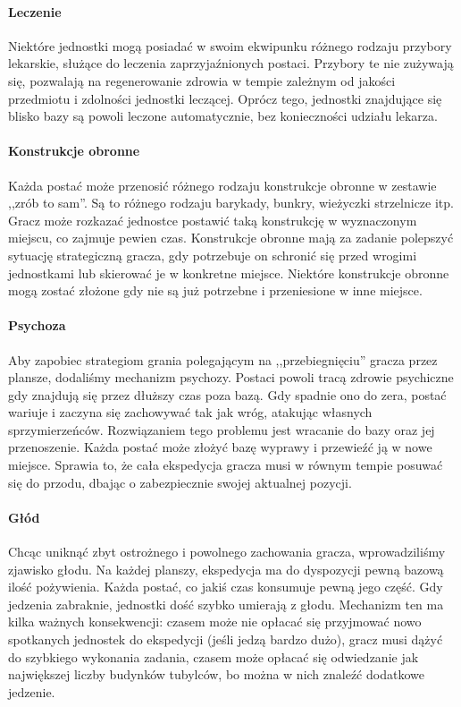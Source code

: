 \documentclass[licencjacka]{pracamgr}
\begin{document}
    \paragraph{Leczenie}
      Niektóre jednostki mogą posiadać w swoim ekwipunku różnego rodzaju przybory lekarskie, służące do leczenia zaprzyjaźnionych postaci.
      Przybory te nie zużywają się, pozwalają na regenerowanie zdrowia w tempie zależnym od jakości przedmiotu i zdolności jednostki leczącej.
      Oprócz tego, jednostki znajdujące się blisko bazy są powoli leczone automatycznie, bez konieczności udziału lekarza.
    \paragraph{Konstrukcje obronne}
      Każda postać może przenosić różnego rodzaju konstrukcje obronne w zestawie ,,zrób to sam''. Są to różnego rodzaju barykady, bunkry, wieżyczki
      strzelnicze itp. Gracz może rozkazać jednostce postawić taką konstrukcję w wyznaczonym miejscu, co zajmuje pewien czas.
      Konstrukcje obronne mają za zadanie polepszyć sytuację strategiczną gracza, gdy potrzebuje on schronić się przed wrogimi jednostkami lub
      skierować je w konkretne miejsce. Niektóre konstrukcje obronne mogą zostać złożone gdy nie są już potrzebne i przeniesione w inne miejsce.
    \paragraph{Psychoza}
      Aby zapobiec strategiom grania polegającym na ,,przebiegnięciu'' gracza przez plansze, dodaliśmy mechanizm psychozy. Postaci
      powoli tracą zdrowie psychiczne gdy znajdują się przez dłuższy czas poza bazą. Gdy spadnie ono do zera, postać wariuje i
      zaczyna się zachowywać tak jak wróg, atakując własnych sprzymierzeńców. Rozwiązaniem tego problemu jest wracanie do bazy oraz jej przenoszenie.
      Każda postać może złożyć bazę wyprawy i przewieźć ją w nowe miejsce. Sprawia to, że cała ekspedycja gracza musi w równym tempie posuwać się
      do przodu, dbając o zabezpiecznie swojej aktualnej pozycji.
    \paragraph{Głód}
      Chcąc uniknąć zbyt ostrożnego i powolnego zachowania gracza, wprowadziliśmy zjawisko głodu. Na każdej planszy, ekspedycja ma do dyspozycji pewną
      bazową ilość pożywienia. Każda postać, co jakiś czas konsumuje pewną jego część. Gdy jedzenia zabraknie, jednostki dość szybko
      umierają z głodu. Mechanizm ten ma kilka ważnych konsekwencji: czasem może nie opłacać się przyjmować nowo spotkanych jednostek do ekspedycji
      (jeśli jedzą bardzo dużo), gracz musi dążyć do szybkiego wykonania zadania, czasem może opłacać się odwiedzanie jak największej liczby budynków
      tubylców, bo można w nich znaleźć dodatkowe jedzenie.
\end{document}
